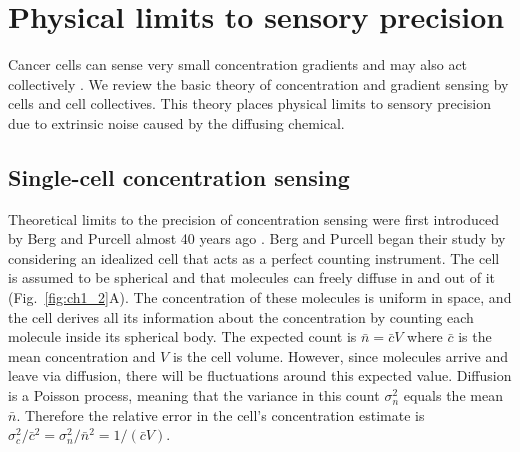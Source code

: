 \section{Physical limits to sensory precision}

Cancer cells can sense very small concentration gradients \cite{shields2007autologous} and may also act collectively
\cite{cheung2013collective, friedl2012classifying, aceto2014circulating, puliafito2015three}.
We review the basic theory of concentration and gradient sensing by cells and cell collectives. This theory places physical limits to sensory precision due to extrinsic noise caused by the diffusing chemical.

\subsection{Single-cell concentration sensing}

Theoretical limits to the precision of concentration sensing were first introduced by Berg and Purcell almost 40 years ago \cite{berg1977physics}. Berg and Purcell began their study by considering an idealized cell that acts as a perfect counting instrument. The cell is assumed to be spherical and that molecules can freely diffuse in and out of it (Fig.\ \ref{fig:ch1_2}A). The concentration of these molecules is uniform in space, and the cell derives all its information about the concentration by counting each molecule inside its spherical body. The expected count is
$\bar{n} = \bar{c}V$ where $\bar{c}$
is the mean concentration and $V$ is the cell volume. However, since molecules arrive and leave via diffusion, there will be fluctuations around this expected value. Diffusion is a Poisson process, meaning that the variance in this count $\sigma_n^2$ equals the mean $\bar{n}$. Therefore the relative error in the cell's concentration estimate is
$\sigma^2_c/\bar{c}^2 = \sigma_n^2/\bar{n}^2 = 1/(\bar{c} V)$.

